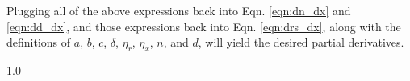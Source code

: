 \documentclass[conference, twocolumn, letterpaper]{IEEEtran}
\begin{document}
Plugging all of the above expressions back into Eqn. \ref{eqn:dn_dx} and \ref{eqn:dd_dx}, and those expressions back into Eqn. \ref{eqn:drs_dx}, along with the definitions of $a$, $b$, $c$, $\delta$, $\eta_r$, $\eta_x$, $n$, and $d$, will yield the desired partial derivatives.

\footnotesize
\begin{spacing}{1.0}


\end{spacing}
\end{document}
